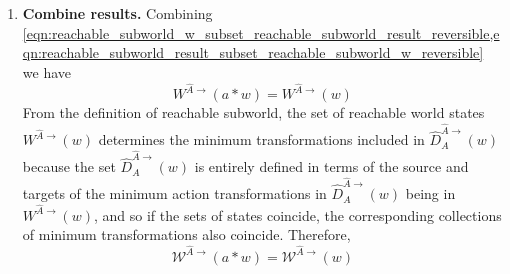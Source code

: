 \begin{proofE}
\begin{enumerate}
    \item \textbf{Combine results.}
    Combining \cref{eqn:reachable_subworld_w_subset_reachable_subworld_result_reversible,eqn:reachable_subworld_result_subset_reachable_subworld_w_reversible} we have
    \begin{equation}
        W^{\hat{A}\to}(a \ast w) = W^{\hat{A}\to}(w)
    \end{equation}
    From the definition of reachable subworld, the set of reachable world states $W^{\hat{A}\to}(w)$ determines the minimum transformations included in $\hat{D}_{A}^{\hat{A}\to}(w)$ because the set $\hat{D}_{A}^{\hat{A}\to}(w)$ is entirely defined in terms of the source and targets of the minimum action transformations in $\hat{D}_{A}^{\hat{A}\to}(w)$ being in $W^{\hat{A}\to}(w)$, and so if the sets of states coincide, the corresponding collections of minimum transformations also coincide.
    Therefore,
    \begin{equation}
        \mathscr{W}^{\hat{A}\to}(a \ast w) = \mathscr{W}^{\hat{A}\to}(w)
    \end{equation}
\end{enumerate}
\end{proofE}

